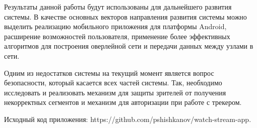 	Результаты данной работы будут использованы для дальнейшего развития системы. В качестве основных векторов
	направления развития системы можно выделить реализацию мобильного приложения для платформы Android, расширение
	возможностей пользователя, применение более эффективных алгоритмов для построения оверлейной сети и передачи
	данных между узлами в сети.

	Одним из недостатков системы на текущий момент является вопрос безопасности, который касается всех частей системы.
	Так, необходимо исследовать и реализовать механизм для защиты зрителей от получения некорректных сегментов и
	механизм для авторизации при работе с трекером.

	Исходный код приложения: https://github.com/pshishkanov/watch-stream-app.


